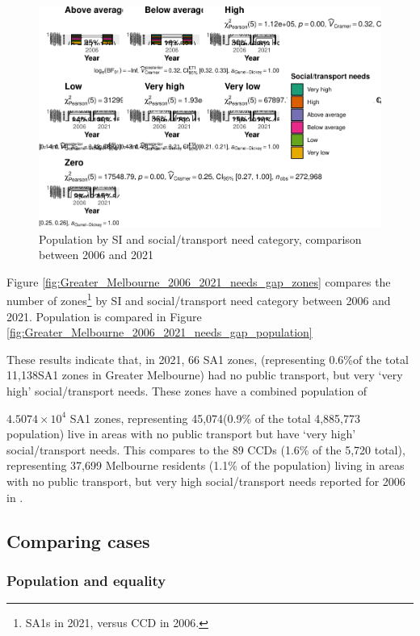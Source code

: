 \documentclass[preprint, 3p,
authoryear]{elsarticle} %
\begin{document}
\begin{figure}
\centering
\includegraphics{Leveraging_GTFS_to_assess_transit_supply_Transport_Geography_files/figure-latex/Greater_Melbourne_2006_2021_needs_gap_population-1.pdf}
\caption{Population by SI and social/transport need category, comparison
between 2006 and 2021}
\end{figure}

Figure \ref{fig:Greater_Melbourne_2006_2021_needs_gap_zones} compares
the number of zones\footnote{SA1s in 2021, versus CCD in 2006.} by SI
and social/transport need category between 2006 and 2021. Population is
compared in Figure
\ref{fig:Greater_Melbourne_2006_2021_needs_gap_population}

These results indicate that, in 2021, 66 SA1 zones, (representing
0.6\%of the total 11,138SA1 zones in Greater Melbourne) had no public
transport, but very `very high' social/transport needs. These zones have
a combined population of

\ensuremath{4.5074\times 10^{4}} SA1 zones, representing 45,074(0.9\% of
the total 4,885,773 population) live in areas with no public transport
but have `very high' social/transport needs. This compares to the 89
CCDs (1.6\% of the 5,720 total), representing 37,699 Melbourne residents
(1.1\% of the population) living in areas with no public transport, but
very high social/transport needs reported for 2006 in
\citet{currie2010identifying}.

\subsection{Comparing cases}\label{comparing-cases}

\subsubsection{Population and equality}\label{population-and-equality}
\end{document}

